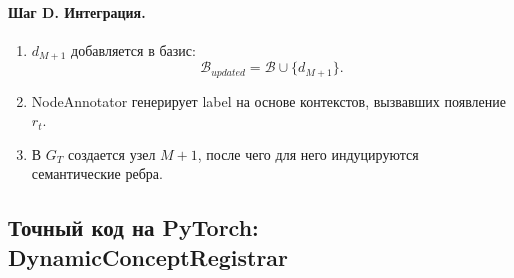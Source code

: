\documentclass[11pt,a4paper]{article}
\begin{document}
\paragraph{Шаг D. Интеграция.}
\begin{enumerate}
    \item $d_{M+1}$ добавляется в базис:
    \[
    \mathcal{B}_{updated}
    =\mathcal{B}\cup\{d_{M+1}\}.
    \]
    \item NodeAnnotator генерирует label на основе контекстов, вызвавших появление $r_t$.
    \item В $G_T$ создается узел $M+1$, после чего для него индуцируются семантические ребра.
\end{enumerate}

\iffalse
\subsection*{Точный код на PyTorch: DynamicConceptRegistrar}
\end{document}
